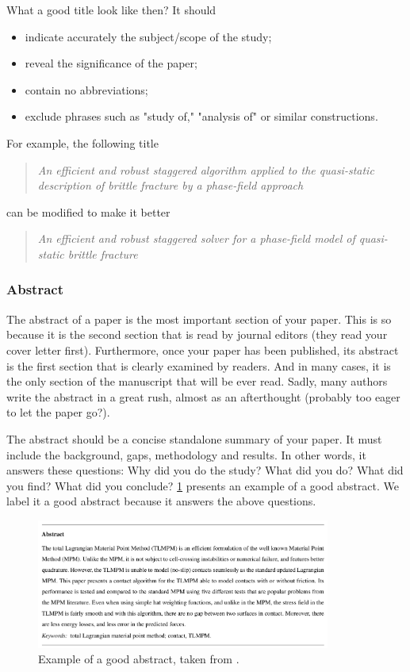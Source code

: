 \documentclass[authoryear,12pta4paper,fleqn]{article}
\numberwithin{equation}{section}
\theoremstyle{remark}
\begin{document}
What a good title look like then? It should

\begin{itemize}
\item indicate accurately the subject/scope of the study;
\item reveal the significance of the paper;
\item contain no abbreviations;
\item exclude phrases such as "study of," "analysis of" or similar constructions.
\end{itemize}

For example, the following title 
\begin{quote}
  \textit{An efficient and robust staggered algorithm applied to the quasi-static description 
  of brittle fracture by a phase-field approach}
 \end{quote}
can be modified to make it better
\begin{quote}
  \textit{An efficient and robust staggered solver for a phase-field model of  quasi-static 
  brittle fracture}
\end{quote}
\subsubsection{Abstract}\label{sec:abstract}

The abstract of a paper is the most important section of your paper. This is so because it is the second section that is read by journal editors (they read your cover letter first). Furthermore, once your paper has been published, its abstract is the first section that is clearly examined by readers. And in many cases, it is the only section of the manuscript that will be ever read. Sadly, many authors write the abstract in a great rush, almost as an afterthought (probably too eager to let the paper go?).

The abstract should be a concise standalone summary of your paper. It must include the background, gaps, methodology and results. In other words, it answers these questions: Why did you do the study? What did you do?  What did you find? What did you conclude? \cref{fig:abstract} presents an example of a good abstract. We label it a good abstract because it answers the above questions.

\begin{figure}[h!]
\centering
\includegraphics[width=0.86\textwidth]{abstract}
\caption{Example of a good abstract, taken from \cite{de2021modelling}.}
\label{fig:abstract}
\end{figure}
\end{document}
